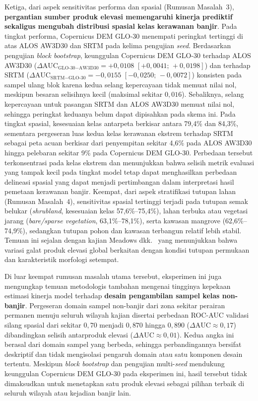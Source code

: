 \documentclass[12pt]{article}
\begin{document}
Ketiga, dari aspek sensitivitas performa dan spasial (Rumusan Masalah~3),
\textbf{pergantian sumber produk elevasi memengaruhi kinerja prediktif
sekaligus mengubah distribusi spasial kelas kerawanan banjir}. Pada tingkat
performa, Copernicus DEM GLO-30 menempati peringkat tertinggi di atas ALOS
AW3D30 dan SRTM pada kelima pengujian \textit{seed}. Berdasarkan pengujian
\textit{block bootstrap}, keunggulan Copernicus DEM GLO-30 terhadap ALOS
AW3D30 ($\Delta\text{AUC}_{\text{GLO-30}-\text{AW3D30}} = +0{,}0108$
$[+0{,}0041;\,+0{,}0198]$) dan terhadap SRTM
($\Delta\text{AUC}_{\text{SRTM}-\text{GLO-30}} = -0{,}0155$
$[-0{,}0250;\,-0{,}0072]$) konsisten pada sampel ulang blok karena kedua
selang kepercayaan tidak memuat nilai nol, meskipun besaran selisihnya kecil
(maksimal sekitar $0{,}016$). Sebaliknya, selang kepercayaan untuk pasangan
SRTM dan ALOS AW3D30 memuat nilai nol, sehingga peringkat keduanya belum
dapat dipisahkan pada skema ini. Pada tingkat spasial, kesesuaian kelas
antarpeta berkisar antara 79,4\% dan 84,3\%, sementara pergeseran luas kedua
kelas kerawanan ekstrem terhadap SRTM sebagai peta acuan berkisar dari
penyempitan sekitar 4,6\% pada ALOS AW3D30 hingga pelebaran sekitar 9\%
pada Copernicus DEM GLO-30. Perbedaan tersebut terkonsentrasi pada kelas ekstrem dan
menunjukkan bahwa selisih metrik evaluasi yang tampak kecil pada tingkat
model tetap dapat menghasilkan perbedaan delineasi spasial yang dapat
menjadi pertimbangan dalam interpretasi hasil pemetaan kerawanan banjir.
Keempat, dari aspek stratifikasi tutupan lahan
(Rumusan Masalah~4), sensitivitas spasial tertinggi terjadi pada tutupan
semak belukar (\textit{shrubland}, kesesuaian kelas 57,6\%--75,4\%), lahan
terbuka atau vegetasi jarang (\textit{bare/sparse vegetation},
63,1\%--78,1\%), serta kawasan mangrove (62,6\%--74,9\%), sedangkan tutupan
pohon dan kawasan terbangun relatif lebih stabil. Temuan ini sejalan dengan
kajian Meadows dkk.\ \cite{meadows2024} yang menunjukkan bahwa variasi
galat produk elevasi global berkaitan dengan kondisi tutupan permukaan dan
karakteristik morfologi setempat.

Di luar keempat rumusan masalah utama tersebut, eksperimen ini juga mengungkap
temuan metodologis tambahan mengenai tingginya kepekaan estimasi kinerja model
terhadap \textbf{desain pengambilan sampel kelas non-banjir}. Pergeseran
domain sampel non-banjir dari zona sekitar perairan permanen menuju seluruh
wilayah kajian disertai perbedaan ROC-AUC validasi silang spasial dari sekitar
$0{,}70$ menjadi $0{,}870$ hingga $0{,}890$ ($\Delta\text{AUC} \approx
0{,}17$) dibandingkan selisih antarproduk elevasi
($\Delta\text{AUC} \approx 0{,}01$). Kedua angka ini berasal dari domain
sampel yang berbeda, sehingga perbandingannya bersifat deskriptif dan tidak
mengisolasi pengaruh domain atau satu komponen desain tertentu. Meskipun
\textit{block bootstrap} dan pengujian multi-\textit{seed} mendukung keunggulan
Copernicus DEM GLO-30 pada eksperimen ini, hasil tersebut tidak dimaksudkan
untuk menetapkan satu produk elevasi sebagai pilihan terbaik di seluruh
wilayah atau kejadian banjir lain.
\end{document}
